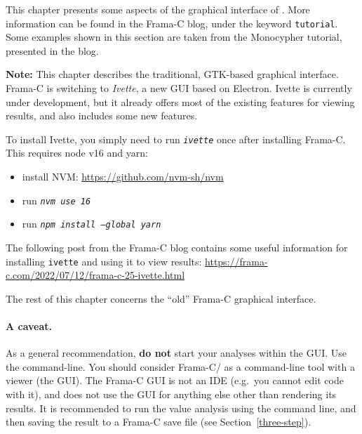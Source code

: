
This chapter presents some aspects of the graphical interface of \Eva{}. More
information can be found in the Frama-C blog, under the keyword
\texttt{tutorial}.
Some examples shown in this section are taken from the Monocypher tutorial,
presented in the blog.

\begin{important}
\textbf{Note:}
This chapter describes the traditional, GTK-based graphical interface.
Frama-C is switching to {\em Ivette}, a new GUI based on Electron.
Ivette is currently under development, but it already offers most of the
existing features for viewing \Eva{} results, and also includes some new
features.

To install Ivette, you simply need to run \texttt{\em ivette} once after
installing Frama-C. This requires node v16 and yarn:
\begin{itemize}
  \item install NVM: \url{https://github.com/nvm-sh/nvm}
  \item run \texttt{\em nvm use 16}
  \item run \texttt{\em npm install --global yarn}
\end{itemize}

The following post from the Frama-C blog contains some useful information
for installing \texttt{ivette} and using it to view \Eva{} results:
\url{https://frama-c.com/2022/07/12/frama-c-25-ivette.html}

The rest of this chapter concerns the ``old'' Frama-C graphical interface.

\end{important}

\paragraph{A caveat.}

As a general recommendation,
  \textbf{do not} start your analyses within the GUI.
  Use the command-line. You should
  consider Frama-C/\Eva{} as a command-line tool with a viewer (the GUI).
  The Frama-C GUI is not an IDE (e.g.~you cannot edit code with it), and
  \Eva{} does not use the GUI for anything else other than rendering its
  results. It is recommended to run the value analysis using the command line,
  and then saving the result to a Frama-C save file
  (see Section~\ref{three-step}).

